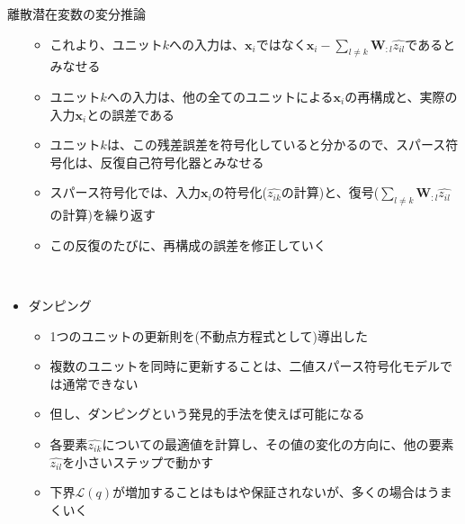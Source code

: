 \documentclass[dvipdfmx,notheorems,t]{beamer}
\begin{document}
\begin{frame}{離散潜在変数の変分推論}
\begin{itemize}
\begin{itemize}
		\item これより、ユニット$k$への入力は、$\bm{x}_i$ではなく$\bm{x}_i - \sum_{l \neq k} \bm{W}_{:l} \widehat{z_{il}}$であるとみなせる
		\item ユニット$k$への入力は、他の全てのユニットによる$\bm{x}_i$の再構成と、実際の入力$\bm{x}_i$との誤差である
		\item ユニット$k$は、この残差誤差を符号化していると分かるので、スパース符号化は、\alert{反復自己符号化器}とみなせる
		\newline
		
		\item スパース符号化では、入力$\bm{x}_i$の符号化($\widehat{z_{ik}}$の計算)と、復号($\sum_{l \neq k} \bm{W}_{:l} \widehat{z_{il}}$の計算)を繰り返す
		\item この反復のたびに、再構成の誤差を修正していく
	\end{itemize} \
	
	\item ダンピング
	\begin{itemize}
		\item 1つのユニットの更新則を(不動点方程式として)導出した
		\item 複数のユニットを同時に更新することは、二値スパース符号化モデルでは通常できない
		\item 但し、\alert{ダンピング}という発見的手法を使えば可能になる
		\newline
		
		\item 各要素$\widehat{z_{ik}}$についての最適値を計算し、その値の変化の方向に、他の要素$\widehat{z_{il}}$を小さいステップで動かす
		\item 下界$\mathcal{L}(q)$が増加することはもはや保証されないが、多くの場合はうまくいく
	\end{itemize}
\end{itemize}

\end{frame}
\end{document}
